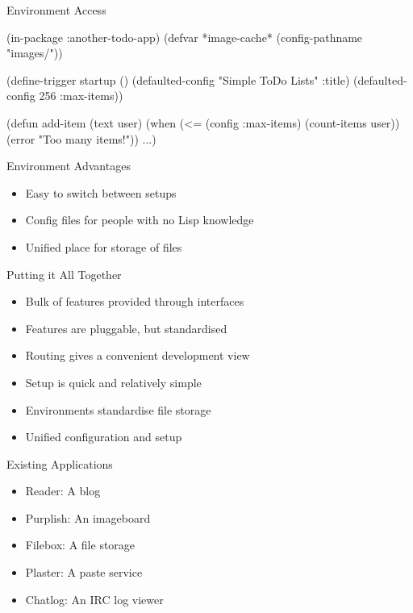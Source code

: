 \documentclass[14pt,t]{beamer}
\renewcommand{\title}[1]{
  {\huge #1} \vskip 0.4cm
}
\begin{document}
\begin{frame}[fragile]
  \title{Environment Access}
\begin{lispcode}
(in-package :another-todo-app)
(defvar *image-cache* (config-pathname "images/"))

(define-trigger startup ()
  (defaulted-config "Simple ToDo Lists" :title)
  (defaulted-config 256 :max-items))

(defun add-item (text user)
  (when (<= (config :max-items) (count-items user))
    (error "Too many items!"))
  ...)
\end{lispcode}
\end{frame}

\begin{frame}
  \title{Environment Advantages}
  \begin{itemize}
  \item Easy to switch between setups
  \item Config files for people with no Lisp knowledge
  \item Unified place for storage of files
  \end{itemize}
\end{frame}

\begin{frame}
  \title{Putting it All Together}
  \begin{itemize}
  \item Bulk of features provided through interfaces
  \item Features are pluggable, but standardised
    \pause \vskip 0.5cm
  \item Routing gives a convenient development view
  \item Setup is quick and relatively simple
    \pause \vskip 0.5cm
  \item Environments standardise file storage
  \item Unified configuration and setup
  \end{itemize}
\end{frame}

\begin{frame}
  \title{Existing Applications}
  \begin{itemize}
  \item Reader: A blog
  \item Purplish: An imageboard
  \item Filebox: A file storage
  \item Plaster: A paste service
  \item Chatlog: An IRC log viewer
  \end{itemize}
\end{frame}
\end{document}
